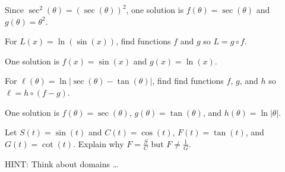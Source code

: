 \documentclass{ximera}
\begin{document}
\begin{question}
\begin{problem}
\begin{solution}
 Since $\sec^{2}(\theta) = (\sec(\theta))^2$, one solution is $f(\theta) = \sec(\theta)$ and $g(\theta) = \theta^2$.
\end{solution}
\end{problem}

\begin{problem}
For $L(x) = \ln (\sin(x) )$, find functions $f$ and $g$ so $L = g \circ f$.

\begin{solution}
One solution is $f(x) = \sin(x)$ and $g(x) = \ln(x)$.
\end{solution}
\end{problem}

\begin{problem} \label{decomposebasicothercircularlast}
For $\ell(\theta) = \ln | \sec(\theta) - \tan(\theta)|$, find  find functions $f$,  $g$, and $h$ so $\ell = h \circ (f-g)$.

\begin{solution}
One solution is $f(\theta) = \sec(\theta)$, $g(\theta) = \tan(\theta)$, and $h(\theta) = \ln| \theta|$.
\end{solution}
\end{problem}

\end{question}


\begin{problem} 
Let $S(t) = \sin(t)$ and $C(t) = \cos(t)$, $F(t) = \tan(t)$, and $G(t) = \cot(t)$.  Explain why $F = \frac{S}{C}$ but $F \neq \frac{1}{G}$.

HINT: Think about domains \ldots

\end{problem}
\end{document}
